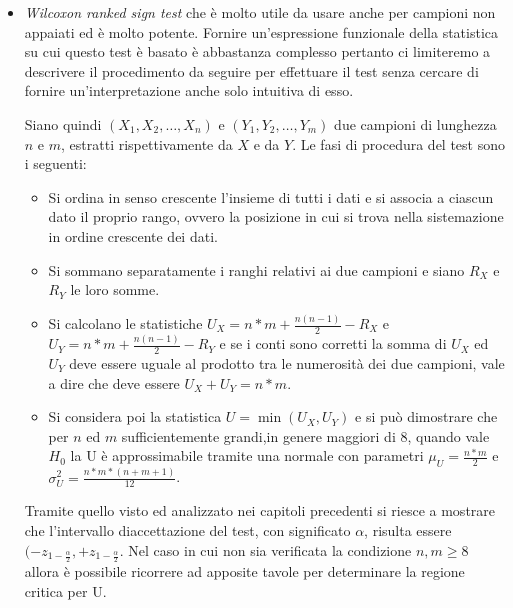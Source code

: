 \begin{itemize}
    \item \emph{Wilcoxon ranked sign test} che è molto utile da usare anche per campioni non appaiati ed è molto potente.\newline
          Fornire un’espressione funzionale della statistica su cui questo test è basato è abbastanza complesso 
          pertanto ci limiteremo a descrivere il procedimento da seguire per effettuare il test senza cercare
          di fornire un’interpretazione anche solo intuitiva di esso.

          Siano quindi $(X_1, X_2, \dots, X_n)$ e $(Y_1, Y_2, \dots, Y_m)$ due campioni di lunghezza $n$ e $m$, estratti
          rispettivamente da $X$ e da $Y$.\newline
          Le fasi di procedura del test sono i seguenti:
          \begin{itemize}
              \item Si ordina in senso crescente l’insieme di tutti i dati e si associa a ciascun dato il proprio rango,
                    ovvero la posizione in cui si trova nella sistemazione in ordine crescente dei dati.
              \item Si sommano separatamente i ranghi relativi ai due campioni e siano $R_X$ e $R_Y$ le loro somme.
              \item Si calcolano le statistiche $U_X = n * m + \frac{n(n - 1)}{2} - R_X$ e $U_Y = n * m + \frac{n(n - 1)}{2} - R_Y$
                    e se i conti sono corretti la somma di $U_X$ ed $U_Y$ deve essere uguale al prodotto tra le
                    numerosità dei due campioni, vale a dire che deve essere $U_X + U_Y = n * m$.
              \item Si considera poi la statistica $U = \min (U_X, U_Y)$ e si può dimostrare che per $n$ ed $m$ 
                    sufficientemente grandi,in genere maggiori di 8, quando vale $H_0$ la U è approssimabile
                    tramite una normale con parametri $\mu_U = \frac{n * m}{2}$ e $\sigma_U^2 = \frac{n * m * (n + m + 1)}{12}$.
          \end{itemize}
          Tramite quello visto ed analizzato nei capitoli precedenti si riesce a mostrare che 
          l'intervallo diaccettazione del test, con significato $\alpha$, risulta essere 
          $(-z_{1 - \frac{\alpha}{2}}, +z_{1 - \frac{\alpha}{2}}$.\newline
          Nel caso in cui non sia verificata la condizione $n, m \geq 8$ allora è possibile ricorrere ad
          apposite tavole per determinare la regione critica per U.


\end{itemize}
